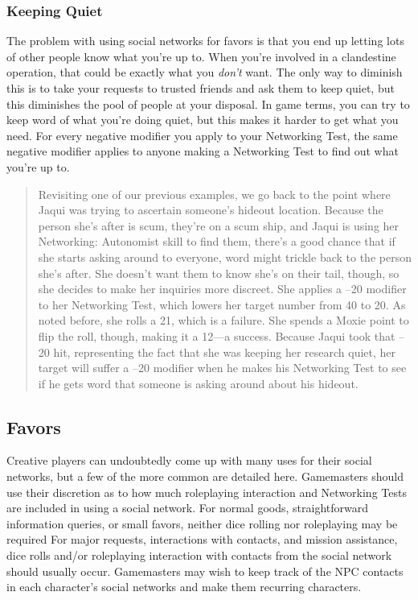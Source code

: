 \subsubsection{Keeping Quiet}

The problem with using social networks for favors is 
that you end up letting lots of other people know what 
you're up to. When you're involved in a clandestine 
operation, that could be exactly what you \textit{don't} want. 
The only way to diminish this is to take your requests 
to trusted friends and ask them to keep quiet, but this 
diminishes the pool of people at your disposal.
In game terms, you can try to keep word of what 
you're doing quiet, but this makes it harder to get 
what you need. For every negative modifier you apply 
to your Networking Test, the same negative modifier 
applies to anyone making a Networking Test to find 
out what you're up to.

\begin{quotation}
Revisiting one of our previous examples, we go
back to the point where Jaqui was trying to
ascertain someone’s hideout location. Because
the person she’s after is scum, they’re on a
scum ship, and Jaqui is using her Networking:
Autonomist skill to find them, there’s a good
chance that if she starts asking around to everyone,
word might trickle back to the person
she’s after. She doesn’t want them to know
she’s on their tail, though, so she decides to
make her inquiries more discreet. She applies
a –20 modifier to her Networking Test, which
lowers her target number from 40 to 20. As
noted before, she rolls a 21, which is a failure.
She spends a Moxie point to flip the roll,
though, making it a 12—a success.
Because Jaqui took that –20 hit, representing
the fact that she was keeping her research
quiet, her target will suffer a –20 modifier
when he makes his Networking Test to see if
he gets word that someone is asking around
about his hideout.
\end{quotation}

\subsection{Favors}

Creative players can undoubtedly come up with many 
uses for their social networks, but a few of the more 
common are detailed here.
Gamemasters should use their discretion as to how 
much roleplaying interaction and Networking Tests 
are included in using a social network. For normal 
goods, straightforward information queries, or small 
favors, neither dice rolling nor roleplaying may be required
For major requests, interactions with contacts,
and mission assistance, dice rolls and/or roleplaying 
interaction with contacts from the social network 
should usually occur. Gamemasters may wish to keep 
track of the NPC contacts in each character's social 
networks and make them recurring characters.

